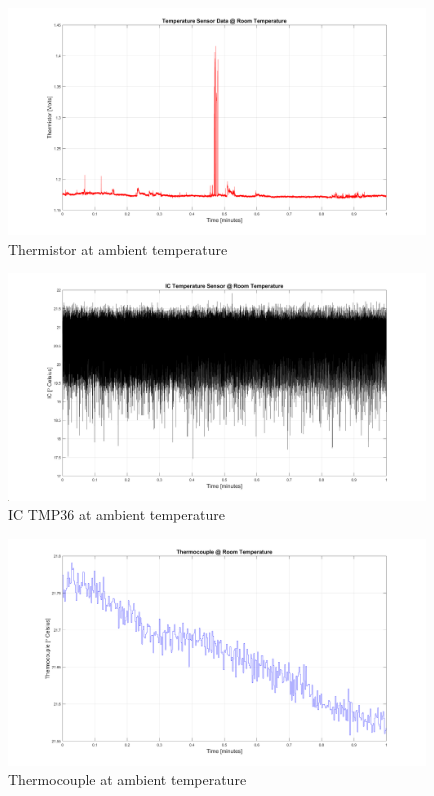 \documentclass{article}
\begin{document}
\begin{figure}[H]
    \centering
    \includegraphics[width=0.985\textwidth]{Lab 2/lab2images/thermistor_volt_roomtemp_1min_plot.png}
    \caption{Thermistor at ambient temperature}
\end{figure}

\begin{figure}[H]
    \centering
    \includegraphics[width=0.985\textwidth]{Lab 2/lab2images/ICTMP36_roomtemp_1min_plot.png}
    \caption{IC TMP36 at ambient temperature}
\end{figure}

\begin{figure}[H]
    \centering
    \includegraphics[width=0.985\textwidth]{Lab 2/lab2images/thermocouple_roomtemp_1min_plot.png}
    \caption{Thermocouple at ambient temperature}
\end{figure}
\end{document}
